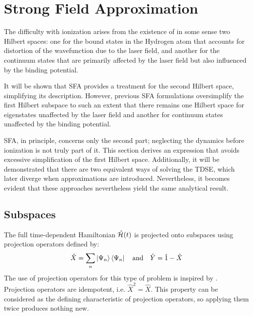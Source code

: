 







\section{Strong Field Approximation}

The difficulty with ionization arises from the existence of in some sense two Hilbert spaces: 
one for the bound states in the Hydrogen atom that accounts for distortion of the wavefunction due to the laser field, and another for the continuum states that are primarily affected by the laser field but also influenced by the binding potential.

It will be shown that SFA provides a treatment for the second Hilbert space, simplifying its description. However, previous SFA formulations oversimplify the first Hilbert subspace to such an extent that there remains one Hilbert space for eigenstates unaffected by the laser field and another for continuum states unaffected by the binding potential.

SFA, in principle, concerns only the second part; neglecting the dynamics before ionization is not truly part of it.
This section derives an expression that avoids excessive simplification of the first Hilbert space.
Additionally, it will be demonstrated that there are two equivalent ways of solving the TDSE, which later diverge when approximations are introduced.
Nevertheless, it becomes evident that these approaches nevertheless yield the same analytical result.









\subsection{Subspaces}
The full time-dependent Hamiltonian $\hat{\mathcal{H}}(t)$ is projected onto subspaces using projection operators defined by:
\begin{equation*}   
    \hat{X} = \sum_{n}\ket{\Psi_n}\bra{\Psi_n}\quad\text{and}\quad\hat{Y}= \hat{1} - \hat{X}
\end{equation*}
The use of projection operators for this type of problem is inspired by \cite{feshbachmethod}.
Projection operators are idempotent, i.e. $\hat{X}^2=\hat{X}$.
This property can be considered as the defining characteristic of projection operators, so applying them twice produces nothing new.

